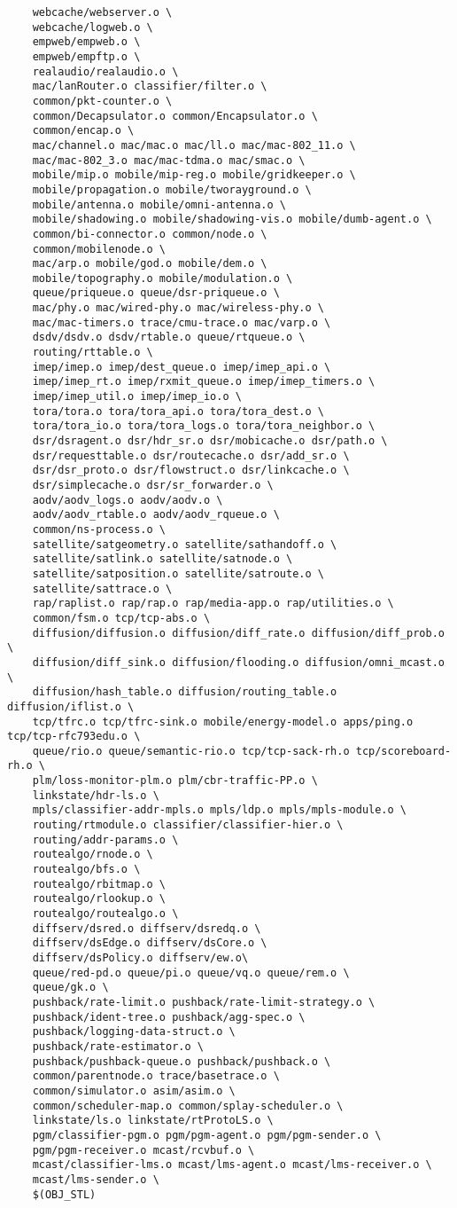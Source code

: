 \begin{verbatim}
	webcache/webserver.o \
	webcache/logweb.o \
	empweb/empweb.o \
	empweb/empftp.o \
	realaudio/realaudio.o \
	mac/lanRouter.o classifier/filter.o \
	common/pkt-counter.o \
	common/Decapsulator.o common/Encapsulator.o \
	common/encap.o \
	mac/channel.o mac/mac.o mac/ll.o mac/mac-802_11.o \
	mac/mac-802_3.o mac/mac-tdma.o mac/smac.o \
	mobile/mip.o mobile/mip-reg.o mobile/gridkeeper.o \
	mobile/propagation.o mobile/tworayground.o \
	mobile/antenna.o mobile/omni-antenna.o \
	mobile/shadowing.o mobile/shadowing-vis.o mobile/dumb-agent.o \
	common/bi-connector.o common/node.o \
	common/mobilenode.o \
	mac/arp.o mobile/god.o mobile/dem.o \
	mobile/topography.o mobile/modulation.o \
	queue/priqueue.o queue/dsr-priqueue.o \
	mac/phy.o mac/wired-phy.o mac/wireless-phy.o \
	mac/mac-timers.o trace/cmu-trace.o mac/varp.o \
	dsdv/dsdv.o dsdv/rtable.o queue/rtqueue.o \
	routing/rttable.o \
	imep/imep.o imep/dest_queue.o imep/imep_api.o \
	imep/imep_rt.o imep/rxmit_queue.o imep/imep_timers.o \
	imep/imep_util.o imep/imep_io.o \
	tora/tora.o tora/tora_api.o tora/tora_dest.o \
	tora/tora_io.o tora/tora_logs.o tora/tora_neighbor.o \
	dsr/dsragent.o dsr/hdr_sr.o dsr/mobicache.o dsr/path.o \
	dsr/requesttable.o dsr/routecache.o dsr/add_sr.o \
	dsr/dsr_proto.o dsr/flowstruct.o dsr/linkcache.o \
	dsr/simplecache.o dsr/sr_forwarder.o \
	aodv/aodv_logs.o aodv/aodv.o \
	aodv/aodv_rtable.o aodv/aodv_rqueue.o \
	common/ns-process.o \
	satellite/satgeometry.o satellite/sathandoff.o \
	satellite/satlink.o satellite/satnode.o \
	satellite/satposition.o satellite/satroute.o \
	satellite/sattrace.o \
	rap/raplist.o rap/rap.o rap/media-app.o rap/utilities.o \
	common/fsm.o tcp/tcp-abs.o \
	diffusion/diffusion.o diffusion/diff_rate.o diffusion/diff_prob.o \
	diffusion/diff_sink.o diffusion/flooding.o diffusion/omni_mcast.o \
	diffusion/hash_table.o diffusion/routing_table.o diffusion/iflist.o \
	tcp/tfrc.o tcp/tfrc-sink.o mobile/energy-model.o apps/ping.o tcp/tcp-rfc793edu.o \
	queue/rio.o queue/semantic-rio.o tcp/tcp-sack-rh.o tcp/scoreboard-rh.o \
	plm/loss-monitor-plm.o plm/cbr-traffic-PP.o \
	linkstate/hdr-ls.o \
	mpls/classifier-addr-mpls.o mpls/ldp.o mpls/mpls-module.o \
	routing/rtmodule.o classifier/classifier-hier.o \
	routing/addr-params.o \
	routealgo/rnode.o \
	routealgo/bfs.o \
	routealgo/rbitmap.o \
	routealgo/rlookup.o \
	routealgo/routealgo.o \
	diffserv/dsred.o diffserv/dsredq.o \
	diffserv/dsEdge.o diffserv/dsCore.o \
	diffserv/dsPolicy.o diffserv/ew.o\
	queue/red-pd.o queue/pi.o queue/vq.o queue/rem.o \
	queue/gk.o \
	pushback/rate-limit.o pushback/rate-limit-strategy.o \
	pushback/ident-tree.o pushback/agg-spec.o \
	pushback/logging-data-struct.o \
	pushback/rate-estimator.o \
	pushback/pushback-queue.o pushback/pushback.o \
	common/parentnode.o trace/basetrace.o \
	common/simulator.o asim/asim.o \
	common/scheduler-map.o common/splay-scheduler.o \
	linkstate/ls.o linkstate/rtProtoLS.o \
	pgm/classifier-pgm.o pgm/pgm-agent.o pgm/pgm-sender.o \
	pgm/pgm-receiver.o mcast/rcvbuf.o \
	mcast/classifier-lms.o mcast/lms-agent.o mcast/lms-receiver.o \
	mcast/lms-sender.o \
	$(OBJ_STL)



\end{verbatim}
